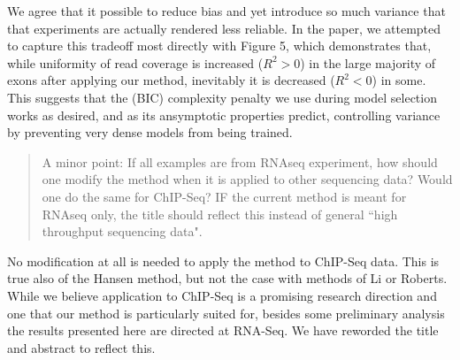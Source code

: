 \documentclass{article}
\begin{document}
We agree that it possible to reduce bias and yet introduce so much variance that
that experiments are actually rendered less reliable. In the paper, we attempted
to capture this tradeoff most directly with Figure 5, which demonstrates that,
while uniformity of read coverage is increased ($R^2 > 0$) in the large majority
of exons after applying our method, inevitably it is decreased ($R^2 < 0$) in
some. This suggests that the (BIC) complexity penalty we use during model
selection works as desired, and as its ansymptotic properties predict,
controlling variance by preventing very dense models from being trained.


\begin{quote}
A minor point: If all examples are from RNAseq experiment, how should
one modify the method when it is applied to other sequencing data?
Would one do the same for ChIP-Seq? IF the current method is meant for
RNAseq only, the title should reflect this instead of general ``high
throughput sequencing data".
\end{quote}

No modification at all is needed to apply the method to ChIP-Seq data. This is
true also of the Hansen method, but not the case with methods of Li or Roberts.
While we believe application to ChIP-Seq is a promising research direction and
one that our method is particularly suited for, besides some preliminary
analysis the results presented here are directed at RNA-Seq. We have
reworded the title and abstract to reflect this.
\end{document}

